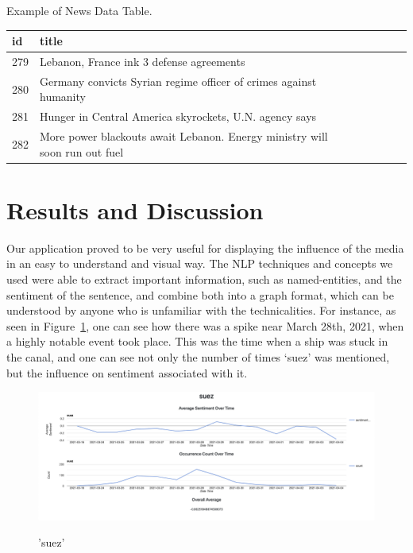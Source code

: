\documentclass[12pt]{article}
\begin{document}
Example of News Data Table.
\begin{table}[H]
    \begin{tabular}{|l|l|l|l|l|l|l|l|}
        \hline
        id & title  \\ \hline
        279    & Lebanon, France ink 3 defense agreements     \\ \hline
        280            & Germany convicts Syrian regime officer of crimes against humanity       \\ \hline
        281           & Hunger in Central America skyrockets, U.N. agency says             \\ \hline
        282           & More power blackouts await Lebanon. Energy ministry will soon run out fuel        \\ \hline
    \end{tabular}
\end{table}

\clearpage

\section{Results and Discussion}
Our application proved to be very useful for displaying the influence of the media in an easy to understand and visual way. The NLP techniques and concepts we used were able to extract important information, such as named-entities, and the sentiment of the sentence, and combine both into a graph format, which can be understood by anyone who is unfamiliar with the technicalities. For instance, as seen in Figure~\ref{suez}, one can see how there was a spike near March 28th, 2021, when a highly notable event took place. This was the time when a ship was stuck in the canal, and one can see not only the number of times `suez' was mentioned, but the influence on sentiment associated with it.

\begin{figure}[htp]
    	\includegraphics[scale=0.25]{suez.PNG} \\
	\caption{'suez'}
	\label{suez}
\end{figure}
\end{document}
